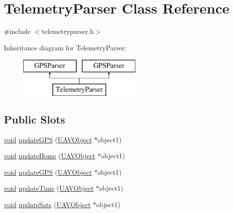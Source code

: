 \hypertarget{class_telemetry_parser}{\section{\-Telemetry\-Parser \-Class \-Reference}
\label{class_telemetry_parser}
}


{\ttfamily \#include $<$telemetryparser.\-h$>$}

\-Inheritance diagram for \-Telemetry\-Parser\-:\begin{figure}[H]
\begin{center}
\leavevmode
\includegraphics[height=2.000000cm]{class_telemetry_parser}
\end{center}
\end{figure}
\subsection*{\-Public \-Slots}
\begin{DoxyCompactItemize}
\item 
\hyperlink{group___u_a_v_objects_plugin_ga444cf2ff3f0ecbe028adce838d373f5c}{void} \hyperlink{group___antenna_track_gadget_plugin_ga9b1c1509701c154ad1c3cdeef0cb522b}{update\-G\-P\-S} (\hyperlink{class_u_a_v_object}{\-U\-A\-V\-Object} $\ast$object1)
\item 
\hyperlink{group___u_a_v_objects_plugin_ga444cf2ff3f0ecbe028adce838d373f5c}{void} \hyperlink{group___antenna_track_gadget_plugin_ga0e7bcbaf20beede5d60913dc50505465}{update\-Home} (\hyperlink{class_u_a_v_object}{\-U\-A\-V\-Object} $\ast$object1)
\item 
\hyperlink{group___u_a_v_objects_plugin_ga444cf2ff3f0ecbe028adce838d373f5c}{void} \hyperlink{group___g_p_s_gadget_plugin_ga9b1c1509701c154ad1c3cdeef0cb522b}{update\-G\-P\-S} (\hyperlink{class_u_a_v_object}{\-U\-A\-V\-Object} $\ast$object1)
\item 
\hyperlink{group___u_a_v_objects_plugin_ga444cf2ff3f0ecbe028adce838d373f5c}{void} \hyperlink{group___g_p_s_gadget_plugin_gadc9bd95e3443207fbededb6a3fd014a7}{update\-Time} (\hyperlink{class_u_a_v_object}{\-U\-A\-V\-Object} $\ast$object1)
\item 
\hyperlink{group___u_a_v_objects_plugin_ga444cf2ff3f0ecbe028adce838d373f5c}{void} \hyperlink{group___g_p_s_gadget_plugin_ga3bdc5591ff2751d19016d60668b18440}{update\-Sats} (\hyperlink{class_u_a_v_object}{\-U\-A\-V\-Object} $\ast$object1)
\end{DoxyCompactItemize}
